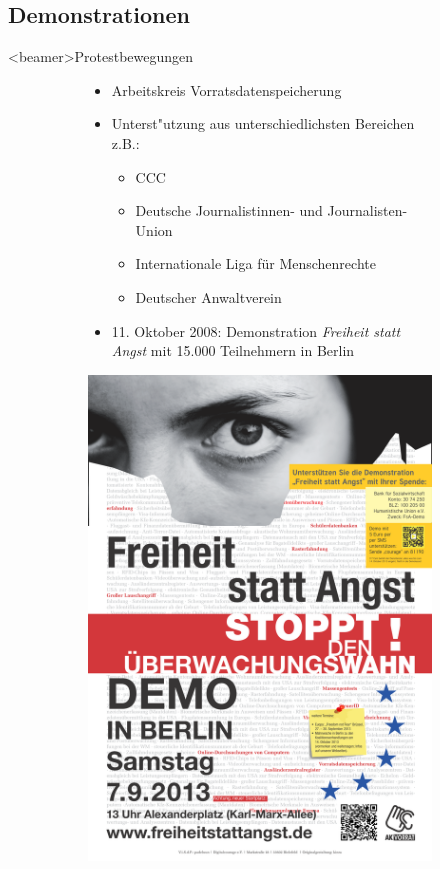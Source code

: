     \subsection*{Demonstrationen}
    \begin{frame}<beamer>{Protestbewegungen}
      \begin{figure}
        \begin{subfigure}[b]{0.5\textwidth}
          \begin{itemize}
            \item Arbeitskreis Vorratsdatenspeicherung
            \item Unterst"utzung aus unterschiedlichsten Bereichen z.B.:
              \begin{itemize}
                \item CCC
                \item Deutsche Journalistinnen- und Journalisten-Union
                \item Internationale Liga für Menschenrechte
                \item Deutscher Anwaltverein
              \end{itemize}
            \item 11. Oktober 2008: Demonstration {\em Freiheit statt Angst} mit 15.000 Teilnehmern in Berlin
          \end{itemize}
        \end{subfigure}
        \begin{subfigure}[b]{0.3\textwidth}
          \includegraphics[scale=0.05]{sections/img/freiheit_statt_angst.png}

\end{subfigure}
\end{figure}
\end{frame}
